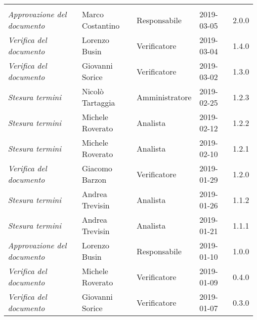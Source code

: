 \newpage 
\section*{}
	\begin{longtable}{p{4cm}|C{3cm}|C{3cm}|R{2.5cm}|R{2cm}}
	
	 & & & & \\
	\endhead
	
		\emph{Approvazione del documento} & Marco Costantino & Responsabile & 2019-03-05 & 2.0.0 \\
		\hline
		
		\emph{Verifica del documento} & Lorenzo Busin & Verificatore & 2019-03-04 & 1.4.0 \\
		\hline
		
		\emph{Verifica del documento} & Giovanni Sorice & Verificatore & 2019-03-02 & 1.3.0 \\
		\hline
	
		\emph{Stesura termini} & Nicolò Tartaggia & Amministratore & 2019-02-25 & 1.2.3 \\
		\hline
	
		\emph{Stesura termini} & Michele Roverato & Analista & 2019-02-12 & 1.2.2 \\
		\hline
	
		\emph{Stesura termini} & Michele Roverato & Analista & 2019-02-10 & 1.2.1 \\
		\hline
	
		\emph{Verifica del documento} & Giacomo Barzon & Verificatore & 2019-01-29 & 1.2.0 \\
		\hline
	
		\emph{Stesura termini} & Andrea Trevisin & Analista & 2019-01-26 & 1.1.2 \\
		\hline
	
		\emph{Stesura termini} & Andrea Trevisin & Analista & 2019-01-21 & 1.1.1 \\
		\hline
		
		\emph{Approvazione del documento} & Lorenzo Busin & Responsabile & 2019-01-10 & 1.0.0 \\
		\hline
		
		\emph{Verifica del documento} & Michele Roverato & Verificatore & 2019-01-09 & 0.4.0 \\
		\hline
		
		\emph{Verifica del documento} & Giovanni Sorice & Verificatore & 2019-01-07 & 0.3.0 \\
		\hline
		

\end{longtable}

